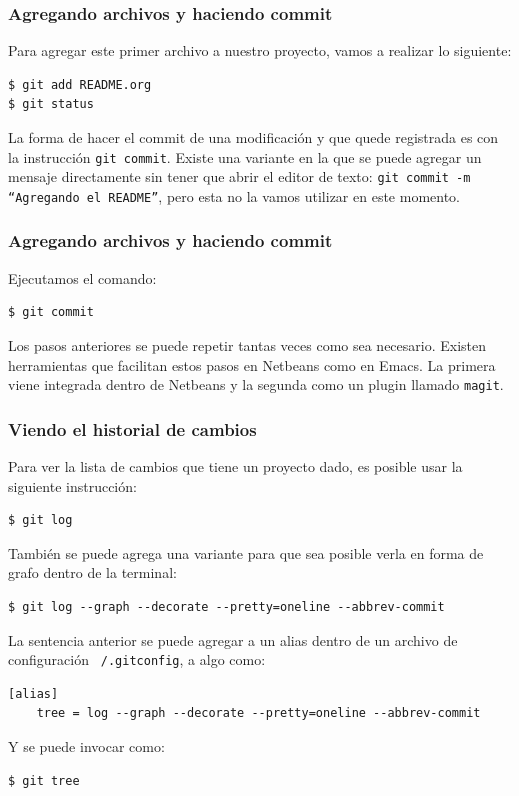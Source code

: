 \documentclass{beamer}
\begin{document}
\begin{frame}[fragile]
  \frametitle{Agregando archivos y haciendo commit}
  Para agregar este primer archivo a nuestro proyecto, vamos a realizar lo
siguiente: \\

\begin{verbatim}
$ git add README.org
$ git status
\end{verbatim}

La forma de hacer el commit de una modificación y que quede registrada
es con la instrucción \texttt{git commit}. Existe una variante en la
que se puede agregar un mensaje directamente sin tener que abrir el
editor de texto: \texttt{git commit -m ``Agregando el README''}, pero
esta no la vamos utilizar en este momento.
\end{frame}

\begin{frame}[fragile]
  \frametitle{Agregando archivos y haciendo commit}

  Ejecutamos el comando:\\

  \begin{verbatim}
$ git commit
  \end{verbatim}

Los pasos anteriores se puede repetir tantas veces como sea
necesario. Existen herramientas que facilitan estos pasos en Netbeans
como en Emacs. La primera viene integrada dentro de Netbeans y la
segunda como un plugin llamado \texttt{magit}.
\end{frame}

\begin{frame}[fragile]
  \frametitle{Viendo el historial de cambios}

  Para ver la lista de cambios que tiene un proyecto dado, es posible usar la
siguiente instrucción:

\begin{verbatim}
$ git log
\end{verbatim}

También se puede agrega una variante para que sea posible verla en forma de
grafo dentro de la terminal:

\begin{verbatim}
$ git log --graph --decorate --pretty=oneline --abbrev-commit
\end{verbatim}

La sentencia anterior se puede agregar a un alias dentro de un archivo de
configuración \texttt{~/.gitconfig}, a algo como:

\begin{verbatim}
[alias]
    tree = log --graph --decorate --pretty=oneline --abbrev-commit
\end{verbatim}

Y se puede invocar como:

\begin{verbatim}
$ git tree
\end{verbatim}

\end{frame}
\end{document}
